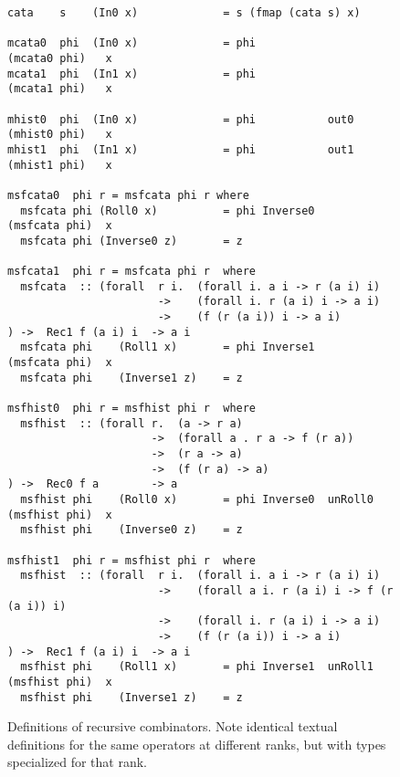 \documentclass[letterpaper,12pt]{article}
\begin{document}
\begin{figure}\small
\begin{verbatim}
cata    s    (In0 x)             = s (fmap (cata s) x)

mcata0  phi  (In0 x)             = phi                    (mcata0 phi)   x
mcata1  phi  (In1 x)             = phi                    (mcata1 phi)   x

mhist0  phi  (In0 x)             = phi           out0     (mhist0 phi)   x
mhist1  phi  (In1 x)             = phi           out1     (mhist1 phi)   x

msfcata0  phi r = msfcata phi r where
  msfcata phi (Roll0 x)          = phi Inverse0           (msfcata phi)  x
  msfcata phi (Inverse0 z)       = z

msfcata1  phi r = msfcata phi r  where
  msfcata  :: (forall  r i.  (forall i. a i -> r (a i) i)
                       ->    (forall i. r (a i) i -> a i)
                       ->    (f (r (a i)) i -> a i)        ) ->  Rec1 f (a i) i  -> a i
  msfcata phi    (Roll1 x)       = phi Inverse1           (msfcata phi)  x
  msfcata phi    (Inverse1 z)    = z

msfhist0  phi r = msfhist phi r  where
  msfhist  :: (forall r.  (a -> r a)
                      ->  (forall a . r a -> f (r a))
                      ->  (r a -> a)                                   
                      ->  (f (r a) -> a)                    ) ->  Rec0 f a        -> a
  msfhist phi    (Roll0 x)       = phi Inverse0  unRoll0  (msfhist phi)  x
  msfhist phi    (Inverse0 z)    = z

msfhist1  phi r = msfhist phi r  where
  msfhist  :: (forall  r i.  (forall i. a i -> r (a i) i)
                       ->    (forall a i. r (a i) i -> f (r (a i)) i)
                       ->    (forall i. r (a i) i -> a i)
                       ->    (f (r (a i)) i -> a i)         ) ->  Rec1 f (a i) i  -> a i
  msfhist phi    (Roll1 x)       = phi Inverse1  unRoll1  (msfhist phi)  x
  msfhist phi    (Inverse1 z)    = z
\end{verbatim}
\caption{Definitions of recursive combinators.
  Note identical textual definitions for the same operators at different ranks,
  but with types specialized for that rank.} 
\label{fig:rcombdef}
\end{figure}
\end{document}
